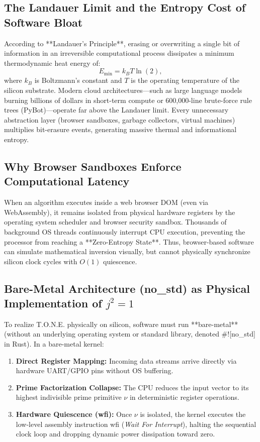 \documentclass[11pt,a4paper,oneside]{article}
\def\texttt#1{#1}%
\theoremstyle{definition}
\begin{document}
\subsection{The Landauer Limit and the Entropy Cost of Software Bloat}
According to **Landauer's Principle**, erasing or overwriting a single bit of information in an irreversible computational process dissipates a minimum thermodynamic heat energy of:
\begin{equation}
E_{\min} = k_B T \ln(2),
\end{equation}
where $k_B$ is Boltzmann's constant and $T$ is the operating temperature of the silicon substrate. Modern cloud architectures—such as large language models burning billions of dollars in short-term compute or 600,000-line brute-force rule trees (\texttt{PyBot})—operate far above the Landauer limit. Every unnecessary abstraction layer (browser sandboxes, garbage collectors, virtual machines) multiplies bit-erasure events, generating massive thermal and informational entropy.

\subsection{Why Browser Sandboxes Enforce Computational Latency}
When an algorithm executes inside a web browser DOM (even via WebAssembly), it remains isolated from physical hardware registers by the operating system scheduler and browser security sandbox. Thousands of background OS threads continuously interrupt CPU execution, preventing the processor from reaching a **Zero-Entropy State**. Thus, browser-based software can simulate mathematical inversion visually, but cannot physically synchronize silicon clock cycles with $O(1)$ quiescence.

\subsection{Bare-Metal Architecture (\texttt{no\_std}) as Physical Implementation of $j^2 = 1$}
To realize T.O.N.E. physically on silicon, software must run **bare-metal** (without an underlying operating system or standard library, denoted \texttt{\#![no\_std]} in Rust). In a bare-metal kernel:
\begin{enumerate}
\item \textbf{Direct Register Mapping:} Incoming data streams arrive directly via hardware UART/GPIO pins without OS buffering.
\item \textbf{Prime Factorization Collapse:} The CPU reduces the input vector to its highest indivisible prime primitive $\nu$ in deterministic register operations.
\item \textbf{Hardware Quiescence (\texttt{wfi}):} Once $\nu$ is isolated, the kernel executes the low-level assembly instruction \texttt{wfi} (\textit{Wait For Interrupt}), halting the sequential clock loop and dropping dynamic power dissipation toward zero.
\end{enumerate}
\end{document}
